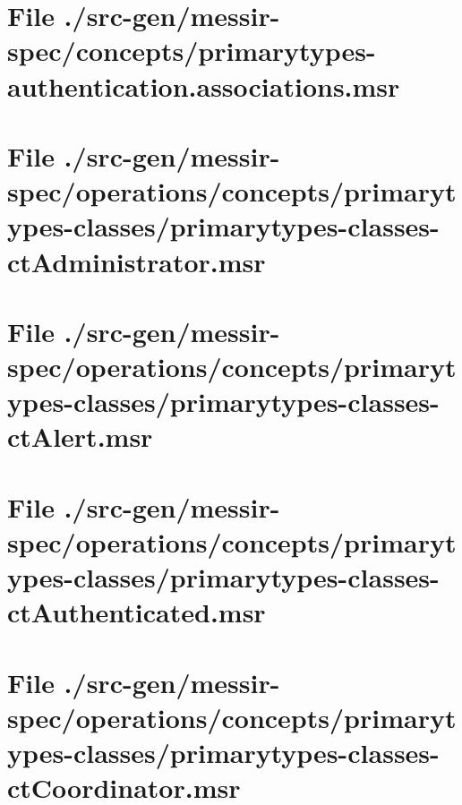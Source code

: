 \section[File /src-gen/messir-spec/concepts/primarytypes-authentication.associations.msr]{File ./src-gen/messir-spec/concepts/primarytypes-authentication.associations.msr}
\scriptsize

\normalsize
	
\section[File /src-gen/messir-spec.../primarytypes-classes-ctAdministrator.msr]{File ./src-gen/messir-spec/operations/concepts/primarytypes-classes/primarytypes-classes-ctAdministrator.msr}
\scriptsize

\normalsize
	
\section[File /src-gen/messir-spec/operations.../primarytypes-classes-ctAlert.msr]{File ./src-gen/messir-spec/operations/concepts/primarytypes-classes/primarytypes-classes-ctAlert.msr}
\scriptsize

\normalsize
	
\section[File /src-gen/messir-spec.../primarytypes-classes-ctAuthenticated.msr]{File ./src-gen/messir-spec/operations/concepts/primarytypes-classes/primarytypes-classes-ctAuthenticated.msr}
\scriptsize

\normalsize
	
\section[File /src-gen/messir-spec/operations.../primarytypes-classes-ctCoordinator.msr]{File ./src-gen/messir-spec/operations/concepts/primarytypes-classes/primarytypes-classes-ctCoordinator.msr}
\scriptsize

\normalsize
	
